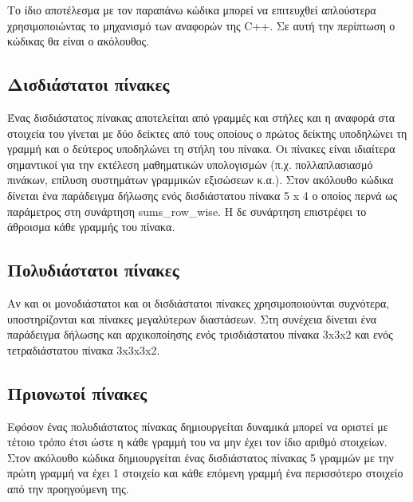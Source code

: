 



Το ίδιο αποτέλεσμα με τον παραπάνω κώδικα μπορεί να επιτευχθεί απλούστερα χρησιμοποιώντας το μηχανισμό των αναφορών της C++. Σε αυτή την περίπτωση ο κώδικας θα είναι ο ακόλουθος.




\subsection{Δισδιάστατοι πίνακες}
Ένας δισδιάστατος πίνακας αποτελείται από γραμμές και στήλες και η αναφορά στα στοιχεία του γίνεται με δύο  δείκτες από τους οποίους ο πρώτος δείκτης υποδηλώνει τη γραμμή και ο δεύτερος υποδηλώνει τη στήλη του πίνακα. Οι πίνακες είναι ιδιαίτερα σημαντικοί για την εκτέλεση μαθηματικών υπολογισμών (π.χ. πολλαπλασιασμό πινάκων, επίλυση συστημάτων γραμμικών εξισώσεων κ.α.). Στον ακόλουθο κώδικα δίνεται ένα παράδειγμα δήλωσης ενός δισδιάστατου πίνακα 5 x 4 ο οποίος περνά ως παράμετρος στη συνάρτηση sums\_row\_wise. Η δε συνάρτηση επιστρέφει το άθροισμα κάθε γραμμής του πίνακα.






\subsection{Πολυδιάστατοι πίνακες}
Αν και οι μονοδιάστατοι και οι δισδιάστατοι πίνακες χρησιμοποιούνται συχνότερα, υποστηρίζονται και πίνακες μεγαλύτερων διαστάσεων. Στη συνέχεια δίνεται ένα παράδειγμα δήλωσης και αρχικοποίησης ενός τρισδιάστατου πίνακα 3x3x2 και ενός τετραδιάστατου πίνακα 3x3x3x2.




\subsection{Πριονωτοί πίνακες}
Εφόσον ένας πολυδιάστατος πίνακας δημιουργείται δυναμικά μπορεί να οριστεί με τέτοιο τρόπο έτσι ώστε η κάθε γραμμή του να μην έχει τον ίδιο αριθμό στοιχείων. Στον ακόλουθο κώδικα δημιουργείται ένας δισδιάστατος πίνακας 5 γραμμών με την πρώτη γραμμή να έχει 1 στοιχείο και κάθε επόμενη γραμμή ένα περισσότερο στοιχείο από την προηγούμενη της.

